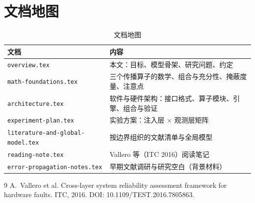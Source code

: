\documentclass[11pt,a4paper]{ctexart}
\begin{document}
\section{文档地图}
\begin{table}[h]
\centering
\small
\begin{tabularx}{\textwidth}{@{}lX@{}}
\toprule
文档 & 内容 \\
\midrule
\texttt{overview.tex} & 本文：目标、模型骨架、研究问题、约定 \\
\texttt{math-foundations.tex} & 三个传播算子的数学、组合与充分性、掩蔽度量、注意点 \\
\texttt{architecture.tex} & 软件与硬件架构：接口格式、算子模块、引擎、组合与验证 \\
\texttt{experiment-plan.tex} & 实验方案：注入层 $\times$ 观测层矩阵 \\
\texttt{literature-and-global-model.tex} & 按边界组织的文献清单与全局模型 \\
\texttt{reading-note.tex} & Vallero 等（ITC 2016）阅读笔记 \\
\texttt{error-propagation-notes.tex} & 早期文献调研与研究空白（背景材料） \\
\bottomrule
\end{tabularx}
\caption{文档地图}
\end{table}

\begin{thebibliography}{9}
 A.~Vallero et al. Cross-layer system reliability assessment framework for hardware faults. ITC, 2016. DOI: 10.1109/TEST.2016.7805863.
\end{thebibliography}
\end{document}
